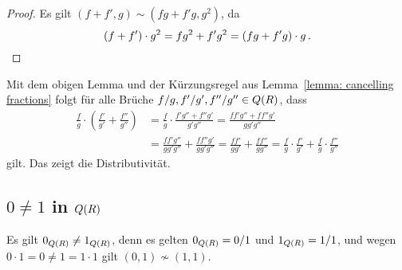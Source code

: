 \begin{proof}
  Es gilt $(f + f', g) \sim (f g + f' g, g^2)$, da
  \[
      (f + f') \cdot g^2
    = f g^2 + f' g^2
    = (f g + f' g) \cdot g \,.
  \qedhere
  \]
\end{proof}

Mit dem obigen Lemma und der Kürzungsregel aus Lemma~\ref{lemma: cancelling fractions} folgt für alle Brüche $f/g, f'/g', f''/g'' \in Q(R)$, dass
\begin{align*}
      \frac{f}{g} \cdot \left( \frac{f'}{g'} + \frac{f''}{g''} \right)
  &=  \frac{f}{g} \cdot \frac{f' g'' + f'' g'}{g' g''}
   =  \frac{f f' g'' + f f'' g'}{g g' g''}  \\
  &=  \frac{f f' g''}{g g' g''} + \frac{f f'' g'}{g g' g''}
   =  \frac{f f'}{g g'} + \frac{f f''}{g g''}
   =  \frac{f}{g} \cdot \frac{f'}{g'} + \frac{f}{g} \cdot \frac{f''}{g''}
\end{align*}
gilt.
Das zeigt die Distributivität.





\subsection*{$0 \neq 1$ in $Q(R)$}

Es gilt $0_{Q(R)} \neq 1_{Q(R)}$, denn es gelten $0_{Q(R)} = 0/1$ und $1_{Q(R)} = 1/1$, und wegen $0 \cdot 1 = 0 \neq 1 = 1 \cdot 1$ gilt $(0,1) \nsim (1,1)$.

